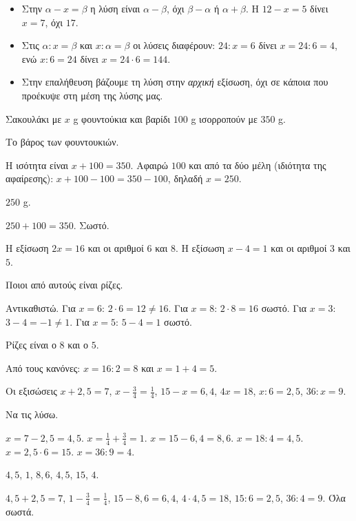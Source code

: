 \begin{prosoxi}
\begin{itemize}[leftmargin=1.2em,itemsep=0.3ex,topsep=2pt]
\item Στην $\alpha-x=\beta$ η λύση είναι $\alpha-\beta$, όχι $\beta-\alpha$ ή $\alpha+\beta$. Η $12-x=5$ δίνει $x=7$, όχι $17$.
\item Στις $\alpha:x=\beta$ και $x:\alpha=\beta$ οι λύσεις διαφέρουν: $24:x=6$ δίνει $x=24:6=4$, ενώ $x:6=24$ δίνει $x=24\cdot6=144$.
\item Στην επαλήθευση βάζουμε τη λύση στην \emph{αρχική} εξίσωση, όχι σε κάποια που προέκυψε στη μέση της λύσης μας.
\end{itemize}
\end{prosoxi}


\tixero Σακουλάκι με $x$ g φουντούκια και βαρίδι $100$ g ισορροπούν με $350$ g.\par
\tithelo Το βάρος των φουντουκιών.\par
\possindeo Η ισότητα είναι $x+100=350$. Αφαιρώ $100$ και από τα δύο μέλη (ιδιότητα της αφαίρεσης): $x+100-100=350-100$, δηλαδή $x=250$.\par
\apantisi $250$ g.\par
\elegxos $250+100=350$. Σωστό.

\tixero Η εξίσωση $2x=16$ και οι αριθμοί $6$ και $8$. Η εξίσωση $x-4=1$ και οι αριθμοί $3$ και $5$.\par
\tithelo Ποιοι από αυτούς είναι ρίζες.\par
\possindeo Αντικαθιστώ. Για $x=6$: $2\cdot6=12\neq16$. Για $x=8$: $2\cdot8=16$ σωστό. Για $x=3$: $3-4=-1\neq1$. Για $x=5$: $5-4=1$ σωστό.\par
\apantisi Ρίζες είναι ο $8$ και ο $5$.\par
\elegxos Από τους κανόνες: $x=16:2=8$ και $x=1+4=5$.

\tixero Οι εξισώσεις $x+2{,}5=7$, $x-\frac{3}{4}=\frac{1}{4}$, $15-x=6{,}4$, $4x=18$, $x:6=2{,}5$, $36:x=9$.\par
\tithelo Να τις λύσω.\par
\possindeo $x=7-2{,}5=4{,}5$. $x=\frac{1}{4}+\frac{3}{4}=1$. $x=15-6{,}4=8{,}6$. $x=18:4=4{,}5$. $x=2{,}5\cdot6=15$. $x=36:9=4$.\par
\apantisi $4{,}5$, $1$, $8{,}6$, $4{,}5$, $15$, $4$.\par
\elegxos $4{,}5+2{,}5=7$, $1-\frac{3}{4}=\frac{1}{4}$, $15-8{,}6=6{,}4$, $4\cdot4{,}5=18$, $15:6=2{,}5$, $36:4=9$. Όλα σωστά.


